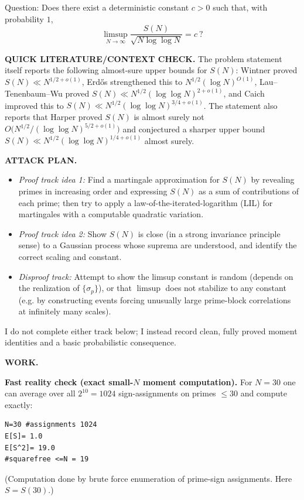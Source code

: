 Question: Does there exist a deterministic constant $c>0$ such that, with probability $1$,
\[\limsup_{N\to\infty}\frac{S(N)}{\sqrt{N\log\log N}}=c\ ?\]

\bigskip
\noindent\textbf{QUICK LITERATURE/CONTEXT CHECK.}
The problem statement itself reports the following almost-sure upper bounds for $S(N)$: Wintner proved $S(N)\ll N^{1/2+o(1)}$, Erd\H{o}s strengthened this to $N^{1/2}(\log N)^{O(1)}$, Lau--Tenenbaum--Wu proved $S(N)\ll N^{1/2}(\log\log N)^{2+o(1)}$, and Caich improved this to $S(N)\ll N^{1/2}(\log\log N)^{3/4+o(1)}$. The statement also reports that Harper proved $S(N)$ is almost surely not $O\big(N^{1/2}/(\log\log N)^{5/2+o(1)}\big)$ and conjectured a sharper upper bound $S(N)\ll N^{1/2}(\log\log N)^{1/4+o(1)}$ almost surely.

\bigskip
\noindent\textbf{ATTACK PLAN.}
\begin{itemize}
\item \emph{Proof track idea 1:} Find a martingale approximation for $S(N)$ by revealing primes in increasing order and expressing $S(N)$ as a sum of contributions of each prime; then try to apply a law-of-the-iterated-logarithm (LIL) for martingales with a computable quadratic variation.
\item \emph{Proof track idea 2:} Show $S(N)$ is close (in a strong invariance principle sense) to a Gaussian process whose suprema are understood, and identify the correct scaling and constant.
\item \emph{Disproof track:} Attempt to show the limsup constant is random (depends on the realization of $\{\sigma_p\}$), or that $\limsup$ does not stabilize to any constant (e.g. by constructing events forcing unusually large prime-block correlations at infinitely many scales).
\end{itemize}
I do not complete either track below; I instead record clean, fully proved moment identities and a basic probabilistic consequence.

\bigskip
\noindent\textbf{WORK.}

\medskip
\noindent\textbf{Fast reality check (exact small-$N$ moment computation).}
For $N=30$ one can average over all $2^{10}=1024$ sign-assignments on primes $\le 30$ and compute exactly:
\begin{verbatim}
N=30 #assignments 1024
E[S]= 1.0
E[S^2]= 19.0
#squarefree <=N = 19
\end{verbatim}
(Computation done by brute force enumeration of prime-sign assignments. Here $S=S(30)$.)

